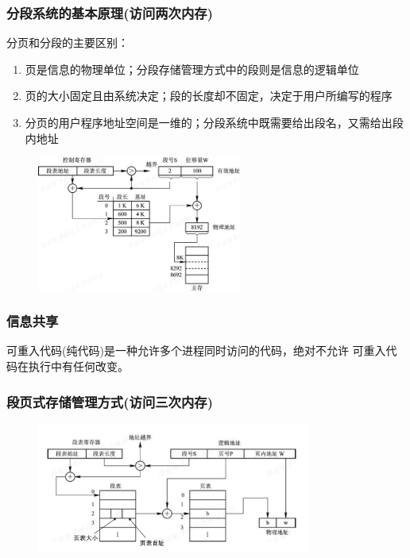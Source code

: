 \documentclass{article}
\begin{document}
\subsubsection{\color{red}分段系统的基本原理(访问两次内存)}
分页和分段的主要区别：
\begin{enumerate}
    \item 页是信息的物理单位；分段存储管理方式中的段则是信息的逻辑单位
    \item 页的大小固定且由系统决定；段的长度却不固定，决定于用户所编写的程序
    \item 分页的用户程序地址空间是一维的；分段系统中既需要给出段名，又需给出段内地址
\end{enumerate}
\begin{figure}[h]
    \centering
    \includegraphics[width=0.6\textwidth]{分段.png}
\end{figure}   

\subsubsection{\color{red}信息共享}
可重入代码(纯代码)是一种允许多个进程同时访问的代码，绝对不允许
可重入代码在执行中有任何改变。   

\subsubsection{\color{red}段页式存储管理方式(访问三次内存)}
\vspace*{-0.7cm}
\begin{figure}[h]
    \centering
    \includegraphics[width=0.8\textwidth]{段页式.png}
\end{figure} 
\end{document}
